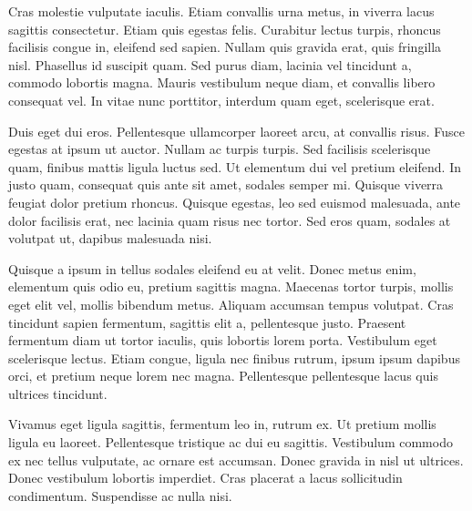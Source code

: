 \documentclass[11pt,]{article}
\begin{document}
Cras molestie vulputate iaculis. Etiam convallis urna metus, in viverra
lacus sagittis consectetur. Etiam quis egestas felis. Curabitur lectus
turpis, rhoncus facilisis congue in, eleifend sed sapien. Nullam quis
gravida erat, quis fringilla nisl. Phasellus id suscipit quam. Sed purus
diam, lacinia vel tincidunt a, commodo lobortis magna. Mauris vestibulum
neque diam, et convallis libero consequat vel. In vitae nunc porttitor,
interdum quam eget, scelerisque erat.

Duis eget dui eros. Pellentesque ullamcorper laoreet arcu, at convallis
risus. Fusce egestas at ipsum ut auctor. Nullam ac turpis turpis. Sed
facilisis scelerisque quam, finibus mattis ligula luctus sed. Ut
elementum dui vel pretium eleifend. In justo quam, consequat quis ante
sit amet, sodales semper mi. Quisque viverra feugiat dolor pretium
rhoncus. Quisque egestas, leo sed euismod malesuada, ante dolor
facilisis erat, nec lacinia quam risus nec tortor. Sed eros quam,
sodales at volutpat ut, dapibus malesuada nisi.

Quisque a ipsum in tellus sodales eleifend eu at velit. Donec metus
enim, elementum quis odio eu, pretium sagittis magna. Maecenas tortor
turpis, mollis eget elit vel, mollis bibendum metus. Aliquam accumsan
tempus volutpat. Cras tincidunt sapien fermentum, sagittis elit a,
pellentesque justo. Praesent fermentum diam ut tortor iaculis, quis
lobortis lorem porta. Vestibulum eget scelerisque lectus. Etiam congue,
ligula nec finibus rutrum, ipsum ipsum dapibus orci, et pretium neque
lorem nec magna. Pellentesque pellentesque lacus quis ultrices
tincidunt.

Vivamus eget ligula sagittis, fermentum leo in, rutrum ex. Ut pretium
mollis ligula eu laoreet. Pellentesque tristique ac dui eu sagittis.
Vestibulum commodo ex nec tellus vulputate, ac ornare est accumsan.
Donec gravida in nisl ut ultrices. Donec vestibulum lobortis imperdiet.
Cras placerat a lacus sollicitudin condimentum. Suspendisse ac nulla
nisi.
\end{document}
